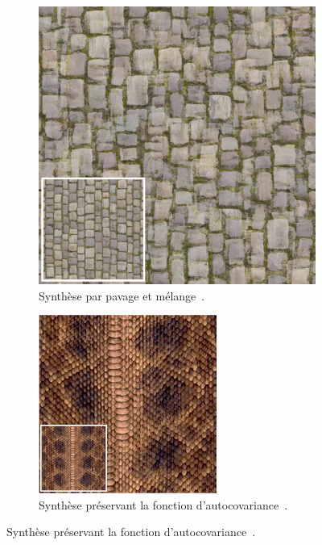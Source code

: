 \begin{figure}
    \centering
    \begin{subfigure}{.45\textwidth}
        \includegraphics[width=\textwidth]{contenu/resources/images/hpn_failure}
        \caption{Synthèse par pavage et mélange~\cite{heitz_high-performance_2018}.}
    \end{subfigure}
    \hfill
    \begin{subfigure}{.45\textwidth}
        \includegraphics[width=\textwidth]{contenu/resources/images/acf_preserving_hpn_failure}
        \caption{Synthèse préservant la fonction d'autocovariance~\cite{lutz_preserving_2023}.}
    \end{subfigure}


\end{figure}

